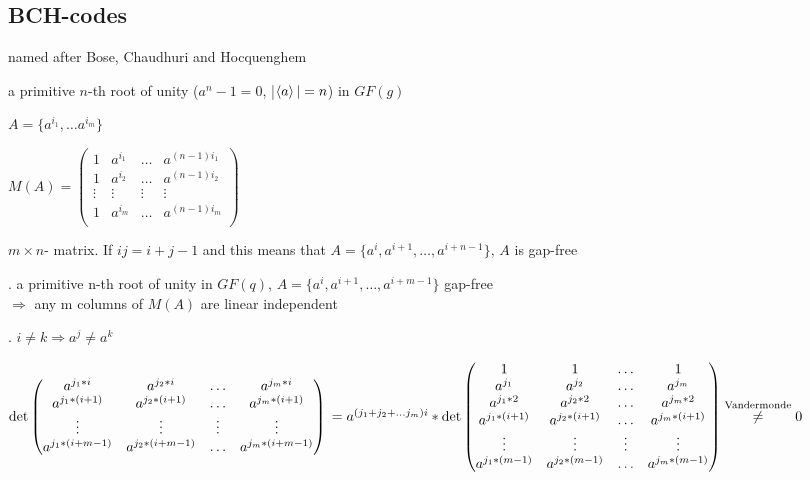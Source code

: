 \subsection{BCH-codes }
named after Bose, Chaudhuri and Hocquenghem

a primitive $n$-th root of unity ($a^n-1=0$, |$\left\langle a \right\rangle|=n$) in $GF(g)$

$A = \{a^{i_1}, \ldots a^{i_m}\}$

$M(A) = \begin{pmatrix}
  1 & a^{i_1} & \ldots & a^{(n-1)i_1} \\
  1 & a^{i_2} & \ldots & a^{(n-1)i_2} \\
  \vdots  & \vdots & \vdots & \vdots \\
  1 & a^{i_m} & \ldots & a^{(n-1)i_m} \\
\end{pmatrix}$

$m\times n$- matrix. If $ij = i+j-1$ and this means that $A = \{a^i, a^{i+1}, \ldots, a^{i+n-1} \}$, $A$ is gap-free

\Theorem.
a primitive n-th root of unity in $GF(q)$, $A = \{a^i, a^{i+1}, \ldots, a^{i+m-1} \}$ gap-free\\
$\Rightarrow$ any m columns of $M(A)$ are linear independent

\Proof.
$i\neq k \Rightarrow a^j \neq a^k$

$\det \begin{pmatrix}
  a^{j_1*i} & a^{j_2*i} & \ldots & a^{j_m*i} \\
  a^{j_1*(i+1)} & a^{j_2*(i+1)} & \ldots & a^{j_m*(i+1)} \\
  \vdots  & \vdots & \vdots & \vdots \\
  a^{j_1*(i+m-1)} & a^{j_2*(i+m-1)} & \ldots & a^{j_m*(i+m-1)} \\
\end{pmatrix}\\
= a^{(j_1+ j_2+ \ldots j_m) i}* \det \begin{pmatrix}
  1 & 1& \ldots & 1\\
  a^{j_1} & a^{j_2} & \ldots & a^{j_m} \\
  a^{j_1*2} & a^{j_2*2} & \ldots & a^{j_m*2} \\
  a^{j_1*(i+1)} & a^{j_2*(i+1)} & \ldots & a^{j_m*(i+1)} \\
  \vdots  & \vdots & \vdots & \vdots \\
  a^{j_1*(m-1)} & a^{j_2*(m-1)} & \ldots & a^{j_m*(m-1)} \\
\end{pmatrix}
\stackrel{\text{Vandermonde}}{\neq} 0$

